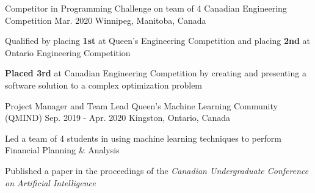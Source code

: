 
\begin{cventries}

  \cventry
    {Competitor in Programming Challenge on team of 4} %
    {Canadian Engineering Competition} %
    {Mar. 2020} %
    {Winnipeg, Manitoba, Canada} %
    {
      \begin{cvitems} %
        \item{Qualified by placing \textbf{1st} at Queen's Engineering Competition and placing \textbf{2nd} at Ontario Engineering Competition} %
        \item{\textbf{Placed 3rd} at Canadian Engineering Competition by creating and presenting a software solution to a complex optimization problem}
      \end{cvitems}
    }


  \cventry
    {Project Manager and Team Lead} %
    {Queen's Machine Learning Community (QMIND)} %
    {Sep. 2019 - Apr. 2020} %
    {Kingston, Ontario, Canada} %
    {
      \begin{cvitems} %
        \item{Led a team of 4 students in using machine learning techniques to perform Financial Planning \& Analysis}
        \item{Published a paper in the proceedings of the \textit{Canadian Undergraduate Conference on Artificial Intelligence}}
      \end{cvitems}
    }


\end{cventries}
